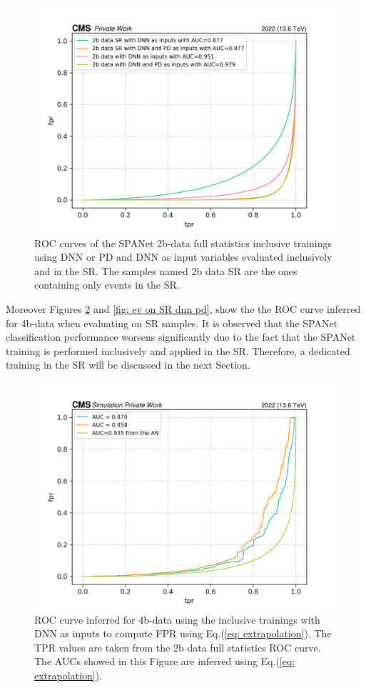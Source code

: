 \begin{figure}[hbt]
    \centering
    \includegraphics[width=0.7\linewidth]{Images/7.S:B/SR stats/2b-data comp.png}
    \caption{ROC curves of the SPANet 2b-data full statistics inclusive trainings using DNN or PD and DNN as input variables evaluated inclusively and in the SR. The samples named 2b data SR are the ones containing only events in the SR.}
    \label{fig: 2b data comparison ev on SR}
\end{figure}

Moreover Figures \ref{fig: ev on SR dnn} and \ref{fig: ev on SR dnn pd}, show the the ROC curve inferred for 4b-data when evaluating on SR samples. It is observed that the SPANet classification performance worsens significantly due to the fact that the SPANet training is performed inclusively and applied in the SR. Therefore, a dedicated training in the SR will be discussed in the next Section.

\begin{figure}[hbt]
    \centering
    \includegraphics[width=0.7\linewidth]{Images/7.S:B/SR stats/4b data extrapol ev on SR dnn.png}
    \caption{ROC curve inferred for 4b-data using the inclusive trainings with DNN as inputs to compute FPR using Eq.(\ref{eq: extrapolation}). The TPR values are taken from the 2b data full statistics ROC curve. The AUCs showed in this Figure are inferred using Eq.(\ref{eq: extrapolation}).}
    \label{fig: ev on SR dnn}
\end{figure}

